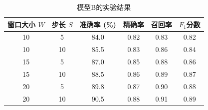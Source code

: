 \begin{table}[htbp]
    \begin{subtable}{\linewidth}
        \centering
        \caption{模型B的实验结果}
        \begin{tabular}{cc|cccc}
            \toprule
            窗口大小 $W$ & 步长 $S$ & 准确率 (\%) & 精确率 & 召回率 & $F_1$分数 \\
            \midrule
            10 & 5 & 84.0 & 0.82 & 0.83 & 0.82 \\
            10 & 10 & 85.5 & 0.83 & 0.86 & 0.84 \\
            15 & 5 & 87.0 & 0.85 & 0.88 & 0.86 \\
            15 & 10 & 88.5 & 0.86 & 0.89 & 0.87 \\
            20 & 5 & 89.8 & 0.87 & 0.90 & 0.88 \\
            20 & 10 & 90.5 & 0.88 & 0.91 & 0.89 \\
            \bottomrule
        \end{tabular}
        \label{tab:modelB_performance}
    \end{subtable}
\end{table}

